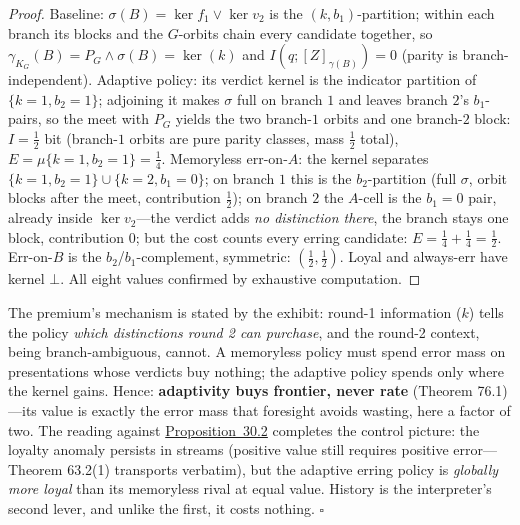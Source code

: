 \begin{proof}

Baseline: \(\sigma(B) = \ker f_1 \vee \ker v_2\) is the \((k, b_1)\)-partition; within each branch its blocks and the \(G\)-orbits chain every candidate together, so \(\gamma_{K_G}(B) = P_G \wedge \sigma(B) = \ker(k)\) and \(I(q; [Z]_{\gamma(B)}) = 0\) (parity is branch-independent). Adaptive policy: its verdict kernel is the indicator partition of \(\{k=1, b_2 = 1\}\); adjoining it makes \(\sigma\) full on branch \(1\) and leaves branch \(2\)'s \(b_1\)-pairs, so the meet with \(P_G\) yields the two branch-\(1\) orbits and one branch-\(2\) block: \(I = \tfrac12\) bit (branch-\(1\) orbits are pure parity classes, mass \(\tfrac12\) total), \(E = \mu\{k=1, b_2=1\} = \tfrac14\). Memoryless err-on-\(A\): the kernel separates \(\{k=1, b_2=1\} \cup \{k=2, b_1=0\}\); on branch \(1\) this is the \(b_2\)-partition (full \(\sigma\), orbit blocks after the meet, contribution \(\tfrac12\)); on branch \(2\) the \(A\)-cell is the \(b_1 = 0\) pair, already inside \(\ker v_2\)---\hspace{0pt}the verdict adds \emph{no distinction there}, the branch stays one block, contribution \(0\); but the cost counts every erring candidate: \(E = \tfrac14 + \tfrac14 = \tfrac12\). Err-on-\(B\) is the \(b_2\)/\(b_1\)-complement, symmetric: \((\tfrac12, \tfrac12)\). Loyal and always-err have kernel \(\bot\). All eight values confirmed by exhaustive computation.
\end{proof}

\begin{thmplain}

The premium's mechanism is stated by the exhibit: round-1 information (\(k\)) tells the policy \emph{which distinctions round 2 can purchase}, and the round-2 context, being branch-ambiguous, cannot. A memoryless policy must spend error mass on presentations whose verdicts buy nothing; the adaptive policy spends only where the kernel gains. Hence: \textbf{adaptivity buys frontier, never rate} (Theorem 76.1)---\hspace{0pt}its value is exactly the error mass that foresight avoids wasting, here a factor of two. The reading against \hyperlink{stmt:30.2}{Proposition~30.2} completes the control picture: the loyalty anomaly persists in streams (positive value still requires positive error---\hspace{0pt}Theorem 63.2(1) transports verbatim), but the adaptive erring policy is \emph{globally more loyal} than its memoryless rival at equal value. History is the interpreter's second lever, and unlike the first, it costs nothing. \(\square\)
\end{thmplain}

